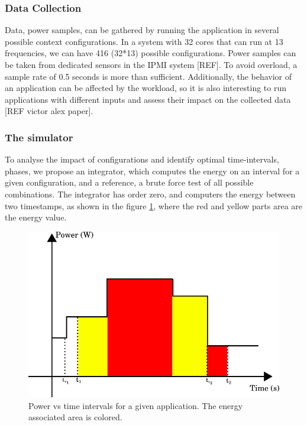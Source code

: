 \subsubsection{Data Collection}
Data, power samples, can be gathered by running the application in several possible context configurations. In a system with 32 cores that can run at 13 frequencies, we can have 416 (32*13) possible configurations. Power samples can be taken from dedicated sensors in the IPMI system [REF]. To avoid overload, a sample rate of 0.5 seconds is more than sufficient. Additionally, the behavior of an application can be affected by the workload, so it is also interesting to run applications with different inputs and assess their impact on the collected data [REF victor alex paper].


\subsubsection{The simulator}
To analyse the impact of configurations and identify optimal time-intervals, phases, we propose an integrator, which computes the energy on an interval for a given configuration, and a reference, a brute force test of all possible combinations. The integrator has order zero, and computers the energy between two timestamps, as shown in the figure \ref{fig:zero_order}, where the red and yellow parts area are the energy value.


\begin{figure}[h]
    \centering
    \includegraphics[width=\columnwidth]{phases/figures/zero_order.png}
    \caption{Power vs time intervals for a given application. The energy associated area is colored.}
    \label{fig:zero_order}
\end{figure}

